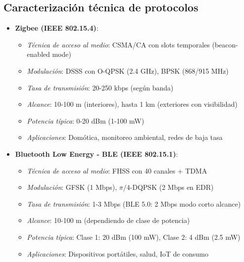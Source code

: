 \subsection*{Caracterización técnica de protocolos}
\begin{itemize}
    \item \textbf{Zigbee (IEEE 802.15.4)}:
        \begin{itemize}
            \item \textit{Técnica de acceso al medio}: CSMA/CA con slots temporales (beacon-enabled mode)
            \item \textit{Modulación}: DSSS con O-QPSK (2.4 GHz), BPSK (868/915 MHz)
            \item \textit{Tasa de transmisión}: 20-250 kbps (según banda)
            \item \textit{Alcance}: 10-100 m (interiores), hasta 1 km (exteriores con visibilidad)
            \item \textit{Potencia típica}: 0-20 dBm (1-100 mW)
            \item \textit{Aplicaciones}: Domótica, monitoreo ambiental, redes de baja tasa \cite{gerenciatecnologicainformatica2013}
        \end{itemize}
    
    \item \textbf{Bluetooth Low Energy - BLE (IEEE 802.15.1)}:
        \begin{itemize}
            \item \textit{Técnica de acceso al medio}: FHSS con 40 canales + TDMA
            \item \textit{Modulación}: GFSK (1 Mbps), $\pi/4$-DQPSK (2 Mbps en EDR)
            \item \textit{Tasa de transmisión}: 1-3 Mbps (BLE 5.0: 2 Mbps modo corto alcance)
            \item \textit{Alcance}: 10-100 m (dependiendo de clase de potencia)
            \item \textit{Potencia típica}: Clase 1: 20 dBm (100 mW), Clase 2: 4 dBm (2.5 mW)
            \item \textit{Aplicaciones}: Dispositivos portátiles, salud, IoT de consumo \cite{Collotta2017}
        \end{itemize}
    

\end{itemize}
